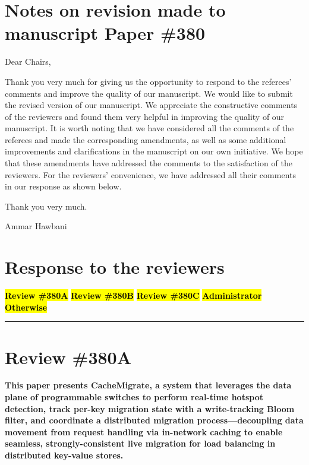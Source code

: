 \documentclass[11pt]{article}
\newcounter{reviewer}
\newcounter{point}[reviewer]
\newcommand{\reviewersection}[1]{
    \bigskip
    \hrule
    \section*{#1}
}
\begin{document}
\section*{Notes on revision made to manuscript Paper \#380}
\vspace{10pt}

Dear Chairs,

Thank you very much for giving us the opportunity to respond to the referees' comments and improve the quality of our manuscript. We would like to submit the revised version of our manuscript. We appreciate the constructive comments of the reviewers and found them very helpful in improving the quality of our manuscript. It is worth noting that we have considered all the comments of the referees and made the corresponding amendments, as well as some additional improvements and clarifications in the manuscript on our own initiative. We hope that these amendments have addressed the comments to the satisfaction of the reviewers. For the reviewers' convenience, we have addressed all their comments in our response as shown below.

Thank you very much.

\noindent Ammar Hawbani

\section*{Response to the reviewers}


\textbf{\hl{Review \#380A}}
\textbf{\hl{Review \#380B}}
\textbf{\hl{Review \#380C}}
\textbf{\hl{Administrator}}
\textbf{\hl{Otherwise}}



\reviewersection{Review \#380A}
\textbf{This paper presents CacheMigrate, a system that leverages the data plane of programmable switches to perform real-time hotspot detection, track per-key migration state with a write-tracking Bloom filter, and coordinate a distributed migration process—decoupling data movement from request handling via in-network caching to enable seamless, strongly-consistent live migration for load balancing in distributed key-value stores.}
\end{document}
